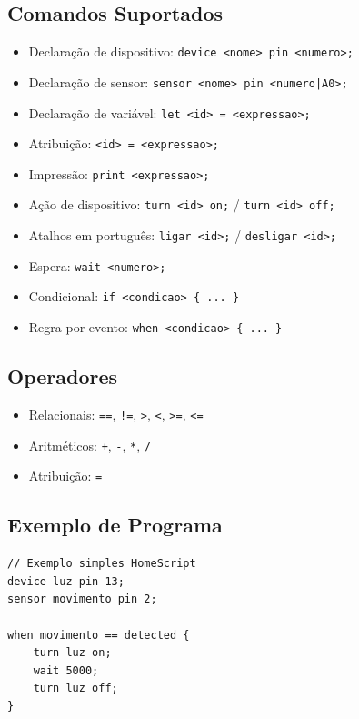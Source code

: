 \documentclass[12pt,a4paper]{article}
\begin{document}
\subsection{Comandos Suportados}
\begin{itemize}
  \item Declaração de dispositivo: \texttt{device <nome> pin <numero>;}
  \item Declaração de sensor: \texttt{sensor <nome> pin <numero|A0>;}
  \item Declaração de variável: \texttt{let <id> = <expressao>;}
  \item Atribuição: \texttt{<id> = <expressao>;}
  \item Impressão: \texttt{print <expressao>;}
  \item Ação de dispositivo: \texttt{turn <id> on;} / \texttt{turn <id> off;}
  \item Atalhos em português: \texttt{ligar <id>;} / \texttt{desligar <id>;}
  \item Espera: \texttt{wait <numero>;}
  \item Condicional: \texttt{if <condicao> \{ ... \}}
  \item Regra por evento: \texttt{when <condicao> \{ ... \}}
\end{itemize}

\subsection{Operadores}
\begin{itemize}
  \item Relacionais: \texttt{==}, \texttt{!=}, \texttt{>}, \texttt{<}, \texttt{>=}, \texttt{<=}
  \item Aritméticos: \texttt{+}, \texttt{-}, \texttt{*}, \texttt{/}
  \item Atribuição: \texttt{=}
\end{itemize}

\subsection{Exemplo de Programa}
\begin{lstlisting}[style=homescript]
// Exemplo simples HomeScript
device luz pin 13;
sensor movimento pin 2;

when movimento == detected {
    turn luz on;
    wait 5000;
    turn luz off;
}
\end{lstlisting}
\end{document}
